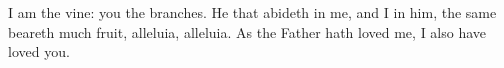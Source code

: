 I am the vine: you the branches.
\versseparator
He that abideth in me, and I in him, the same beareth much fruit, alleluia, alleluia.
\versseparator
As the Father hath loved me, I also have loved you.
